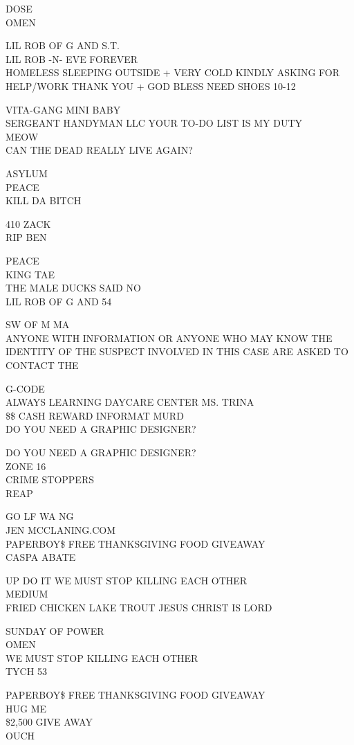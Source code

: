 \documentclass[10pt,letterpaper]{article}
\begin{document}
DOSE\\
OMEN

LIL ROB OF G AND S.T.\\
LIL ROB {-}N{-} EVE FOREVER\\
HOMELESS SLEEPING OUTSIDE + VERY COLD KINDLY ASKING FOR HELP/WORK THANK YOU + GOD BLESS NEED SHOES 10{-}12

VITA{-}GANG MINI BABY\\
SERGEANT HANDYMAN LLC YOUR TO{-}DO LIST IS MY DUTY\\
MEOW\\
CAN THE DEAD REALLY LIVE AGAIN?

ASYLUM\\
PEACE\\
KILL DA BITCH

410 ZACK\\
RIP BEN

PEACE\\
KING TAE\\
THE MALE DUCKS SAID NO\\
LIL ROB OF G AND 54

SW OF M MA\\
ANYONE WITH INFORMATION OR ANYONE WHO MAY KNOW THE IDENTITY OF THE SUSPECT INVOLVED IN THIS CASE ARE ASKED TO CONTACT THE

G{-}CODE\\
ALWAYS LEARNING DAYCARE CENTER MS. TRINA\\
\$\$ CASH REWARD INFORMAT MURD\\
DO YOU NEED A GRAPHIC DESIGNER?

DO YOU NEED A GRAPHIC DESIGNER?\\
ZONE 16\\
CRIME STOPPERS\\
REAP

GO LF WA NG\\
JEN MCCLANING.COM\\
PAPERBOY\$ FREE THANKSGIVING FOOD GIVEAWAY\\
CASPA ABATE

UP DO IT WE MUST STOP KILLING EACH OTHER\\
MEDIUM\\
FRIED CHICKEN LAKE TROUT JESUS CHRIST IS LORD

SUNDAY OF POWER\\
OMEN\\
WE MUST STOP KILLING EACH OTHER\\
TYCH 53

PAPERBOY\$ FREE THANKSGIVING FOOD GIVEAWAY\\
HUG ME\\
\$2,500 GIVE AWAY\\
OUCH
\end{document}
